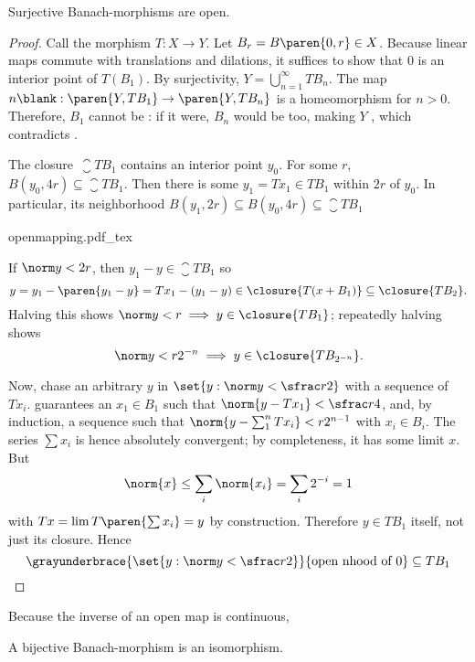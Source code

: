 \documentclass{scrartcl}
\newcommand{\ball}{B}
\begin{document}
\begin{theorem}
  Surjective Banach-morphisms are open.
\end{theorem}
\begin{proof}
  Call the morphism \(T:X\to Y\). Let \(\ball_r=\ball\paren{0,r}\in X\). Because linear maps commute with translations and dilations, it suffices to show that \(0\) is an interior point of \(T(B_1)\). By surjectivity,
  \(Y = \bigcup_{n=1}^\infty TB_n\). The map \(n\blank: \paren{Y,TB_1}\to \paren{Y,TB_n}\) is a homeomorphism for \(n>0\). Therefore, \(B_1\) cannot be : if it were, \(\ball_n\) would be too, making \(Y\) , which contradicts .

  The closure~\(\closure{T\ball_1}\) contains an interior point \(y_0\). For some \(r\), \(\ball(y_0,4r)\subseteq \closure{T\ball_1}\). Then there is some \(y_1=Tx_1\in T\ball_1\) within \(2r\) of \(y_0\). In particular, its neighborhood \(\ball(y_1,2r)\subseteq \ball(y_0,4r)\subseteq \closure{T\ball_1}\)
  \begin{center}
    {openmapping.pdf_tex}
  \end{center}
  If \(\norm y < 2r\), then \(y_1-y\in \closure{T\ball_1}\) so \[y=y_1-\paren{y_1-y} = Tx_1 - (y_1-y)\in \closure{T(x+\ball_1)}\subseteq \closure{T\ball_2}.\] Halving this shows \(\norm y < r \implies y\in \closure{T\ball_1}\); repeatedly halving shows
  \begin{equation}
    \norm y < r2^{-n} \implies y\in \closure{T\ball_{2^{-n}}}.\label{eq:openmap-small enough to be in closed image}
  \end{equation}

Now, chase an arbitrary \(y\) in \(\set{y:\norm y < \sfrac r 2}\) with a sequence of \(Tx_i\).  guarantees an \(x_1\in \ball_1\) such that \(\norm{y-Tx_1} < \sfrac r 4\), and, by induction, a sequence such that \(\norm{y-\sum_1^n Tx_i} < r2^{n-1}\) with \(x_i\in\ball_i\). The series \(\sum x_i\) is hence absolutely convergent; by completeness, it has some limit \(x\). But
\[
  \norm{x} \leq \sum_i \norm{x_i} = \sum_i 2^{-i} = 1
\]
with \(Tx=\lim T\paren{\sum x_i}=y\) by construction. Therefore \(y\in T\ball_1\) itself, not just its closure. Hence
\[
  \grayunderbrace{\set{y: \norm y < \sfrac r 2}}{\text{open nhood of } 0} \subseteq T\ball_1
\]
\end{proof}
Because the inverse of an open map is continuous,
\begin{cor}
  A bijective Banach-morphism is an isomorphism.
\end{cor}
\end{document}
